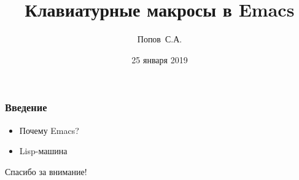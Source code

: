 \documentclass[russian,utf8]{beamer}
\title{Клавиатурные макросы в Emacs}
\author{Попов~С.А.}
\date{25 января 2019}
\begin{document}
\begin{frame}
  \titlepage
\end{frame}


\begin{frame}
  \frametitle{Введение}
  \begin{itemize}
  \item Почему Emacs?
  \item Lisp-машина
  \end{itemize}
\end{frame}


\begin{frame}
  Спасибо за внимание!
\end{frame}
\end{document}
